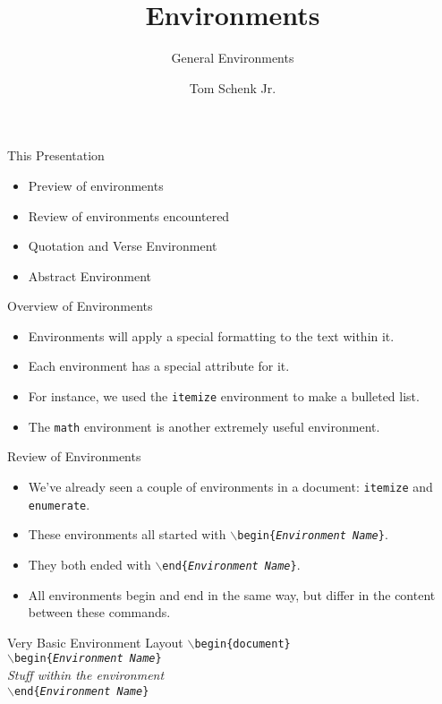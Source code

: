 \documentclass[pdf]{prosper}
\title{Environments}
\subtitle{General Environments}
\author{Tom Schenk Jr.}
\begin{document}
\maketitle
\begin{slide}{This Presentation}
	\begin{itemize}
		\item Preview of environments
		\item Review of environments encountered
		\item Quotation and Verse Environment
		\item Abstract Environment
	\end{itemize}
\end{slide}
\begin{slide}{Overview of Environments}
	\begin{itemize}
		\item Environments will apply a special formatting to the text within it.
		\item Each environment has a special attribute for it.
		\item For instance, we used the \texttt{itemize} environment to make a bulleted list.
		\item The \texttt{math} environment is another extremely useful environment.
	\end{itemize}
\end{slide}
\begin{slide}{Review of Environments}
	\begin{itemize}
		\item We've already seen a couple of environments in a document: \texttt{itemize} and \texttt{enumerate}.
		\item These environments all started with \texttt{$\backslash$begin\{\textit{Environment Name}\}}.
		\item They both ended with \texttt{$\backslash$end\{\textit{Environment Name}\}}.
		\item All environments begin and end in the same way, but differ in the content between these commands.
	\end{itemize}
\end{slide}
\begin{slide}{Very Basic Environment Layout}
	\texttt{$\backslash$begin\{document\}} \\
	\texttt{$\backslash$begin\{\textit{Environment Name}\}} \\
	\textit{Stuff within the environment} \\
	\texttt{$\backslash$end\{\textit{Environment Name}\}} \\
\end{slide}
\end{document}
